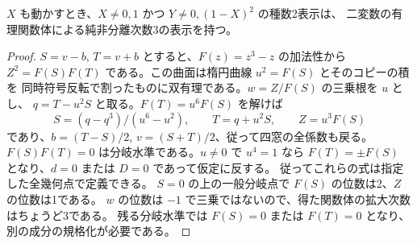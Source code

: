 \begin{proposition}\label{prop:rank-fifteen-rational-unit-surface}
$X$ も動かすとき、$X\ne0,1$ かつ $Y\ne0,(1-X)^2$ の種数2表示は、
二変数の有理関数体による純非分離次数3の表示を持つ。
\end{proposition}
\begin{proof}
$S=v-b$, $T=v+b$ とすると、$F(z)=z^3-z$ の加法性から
$Z^2=F(S)F(T)$ である。この曲面は楕円曲線 $u^2=F(S)$ とそのコピーの積を
同時符号反転で割ったものに双有理である。$w=Z/F(S)$ の三乗根を $u$ とし、
$q=T-u^2S$ と取る。$F(T)=u^6F(S)$ を解けば
\[
 S=(q-q^3)/(u^6-u^2),\qquad T=q+u^2 S,\qquad Z=u^3 F(S)
\]
であり、$b=(T-S)/2$, $v=(S+T)/2$、従って四窓の全係数も戻る。
$F(S)F(T)=0$ は分岐水準である。$u\ne0$ で $u^4=1$ なら
$F(T)=\pm F(S)$ となり、$d=0$ または $D=0$ であって仮定に反する。
従ってこれらの式は指定した全幾何点で定義できる。
$S=0$ の上の一般分岐点で $F(S)$ の位数は2、$Z$ の位数は1である。
$w$ の位数は $-1$ で三乗ではないので、得た関数体の拡大次数はちょうど3である。
残る分岐水準では $F(S)=0$ または $F(T)=0$ となり、別の成分の規格化が必要である。
\end{proof}
